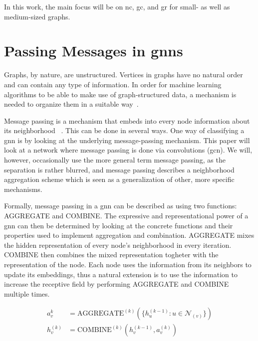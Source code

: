 In this work, the main focus will be on \ac{nc}, \ac{gc}, and \ac{gr} for small- as well as medium-sized graphs.

\section{Passing Messages in \Acsp*{gnn}}
\label{sec:related:message}

Graphs, by nature, are unstructured.
Vertices in graphs have no natural order and can contain any type of information.
In order for machine learning algorithms to be able to make use of graph-structured data, a mechanism is needed to organize them in a
suitable way~\cite{Zhou2020a,Hamilton2017a,Zhang19}.


Message passing is a mechanism that embeds into every node information about its neighborhood ~\cite{Xu2019,Zhou2020a}.
This can be done in several ways.
One way of classifying a \ac{gnn} is by looking at the underlying message-passing mechanism.
This paper will look at a network where message passing is done via convolutions (\acf{gcn}).
We will, however, occasionally use the more general term message passing, as the separation is rather blurred, and message passing describes a neighborhood aggregation scheme which is seen as a generalization of other, more specific mechanisms.

Formally, message passing in a \ac{gnn} can be described as using two functions:
AGGREGATE and COMBINE.
The expressive and representational power of a \ac{gnn} can then be determined by looking at the concrete functions and their properties used to implement aggregation and combination.
AGGREGATE mixes the hidden representation of every node's neighborhood in every iteration. COMBINE then combines the mixed representation togheter with the representation of the node. Each node uses the information from its neighbors to update its embeddings, thus a natural extension is to use the information to increase the receptive field by performing AGGREGATE and COMBINE multiple times.

\begin{align*}
    a_{v}^{k}   & = \mathrm{AGGREGATE}^{(k)}(\{h_{u}^{(k-1)}: u \in \mathcal{N}_{(v)}\}) \\
    h_{v}^{(k)} & = \mathrm{COMBINE}^{(k)}(h_{v}^{(k-1)}, a_{v}^{(k)})
\end{align*}

